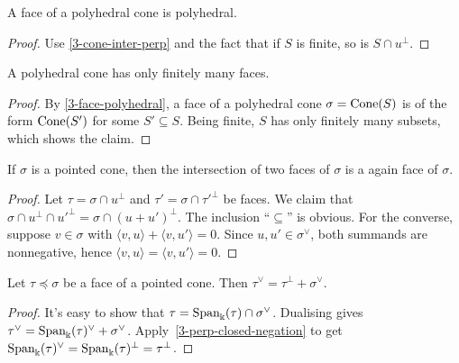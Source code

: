\begin{lemma}
  \label{3-face-polyhedral}
  A face of a polyhedral cone is polyhedral.
\end{lemma}
\begin{proof}
  Use \ref{3-cone-inter-perp} and the fact that if \( S \) is finite,
  so is \( S \cap u^{\perp} \).
\end{proof}



\begin{lemma}
  \label{3-faces-polyhedral-cone-finite}
  A polyhedral cone has only finitely many faces.
\end{lemma}
\begin{proof}
  \uses{}
  By \ref{3-face-polyhedral}, a face of a polyhedral cone \( \sigma =
  \operatorname{Cone}(S) \) is of the form \( \operatorname{Cone}(S') \) for some \( S' \subseteq
  S \). Being finite, \( S \) has only finitely many subsets, which
  shows the claim.
\end{proof}


\begin{lemma}
  \label{3-face-intersection}
  If \( \sigma \) is a pointed cone, then the intersection of two
  faces of \( \sigma \) is a again face of \( \sigma \).
\end{lemma}
\begin{proof}
  \uses{}
  Let \( \tau = \sigma \cap u^{\perp} \) and \( \tau' = \sigma \cap
  \tau'^{\perp} \) be faces. We claim that \( \sigma \cap u^{\perp}
  \cap u'^{\perp} = \sigma \cap (u + u')^{\perp} \). The inclusion
  ``\( \subseteq \)'' is obvious. For the converse, suppose \( v \in
  \sigma \) with \( \langle v, u \rangle + \langle v, u' \rangle = 0
  \). Since \( u, u' \in \sigma^{\vee} \), both summands are
  nonnegative, hence \( \langle v, u \rangle = \langle v, u' \rangle =
  0 \).
\end{proof}

\begin{lemma}
  \label{3-face-dual-eq-sum}
  Let \( \tau \preceq \sigma \) be a face of a pointed cone. Then \(
  \tau^{\vee} = \tau^{\perp} + \sigma^{\vee} \).
\end{lemma}
\begin{proof}
  It's easy to show that \( \tau = \operatorname{Span}_{\Bbbk}(\tau) \cap
  \sigma^{\vee} \). Dualising gives \( \tau^{\vee} =
  \operatorname{Span}_{\Bbbk}(\tau)^{\vee} + \sigma^{\vee} \).
  Apply~\ref{3-perp-closed-negation} to get \(
  \operatorname{Span}_{\Bbbk}(\tau)^{\vee} = \operatorname{Span}_{\Bbbk}(\tau)^{\perp} =
  \tau^{\perp} \).
\end{proof}



